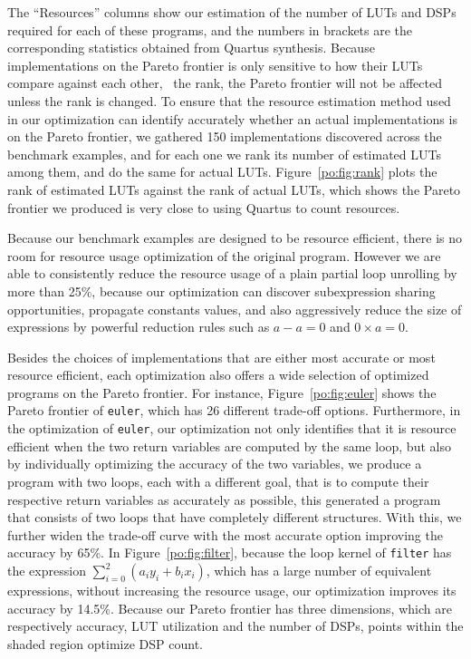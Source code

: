 \begin{figure*}[ht]
    \centering
    \begin{minipage}{0.6\textwidth}
    \end{minipage}\quad\begin{minipage}{0.35\textwidth}
    \end{minipage}
\end{figure*}

The ``Resources'' columns show our estimation of the number of LUTs and
DSPs required for each of these programs, and the numbers in brackets are
the corresponding statistics obtained from Quartus synthesis.  Because
implementations on the Pareto frontier is only sensitive to how their LUTs
compare against each other, \ie~the rank, the Pareto frontier will not be
affected unless the rank is changed.  To ensure that the resource estimation
method used in our optimization can identify accurately whether an actual
implementations is on the Pareto frontier, we gathered 150 implementations
discovered across the benchmark examples, and for each one we rank its
number of estimated LUTs among them, and do the same for actual LUTs.
Figure~\ref{po:fig:rank} plots the rank of estimated LUTs against the rank of
actual LUTs, which shows the Pareto frontier we produced is very close to using
Quartus to count resources.

Because our benchmark examples are designed to be resource efficient, there
is no room for resource usage optimization of the original program.  However
we are able to consistently reduce the resource usage of a plain partial
loop unrolling by more than 25\%, because our optimization can discover
subexpression sharing opportunities, propagate constants values, and also
aggressively reduce the size of expressions by powerful reduction rules such as
$a - a = 0$ and $0 \times a = 0$.

Besides the choices of implementations that are either most accurate or most
resource efficient, each optimization also offers a wide selection of optimized
programs on the Pareto frontier.  For instance, Figure~\ref{po:fig:euler}
shows the Pareto frontier of \texttt{euler}, which has 26 different trade-off
options.  Furthermore, in the optimization of \texttt{euler}, our optimization
not only identifies that it is resource efficient when the two return variables
are computed by the same loop, but also by individually optimizing the
accuracy of the two variables, we produce a program with two loops, each with
a different goal, that is to compute their respective return variables as
accurately as possible, this generated a program that consists of two loops
that have completely different structures.  With this, we further widen the
trade-off curve with the most accurate option improving the accuracy by 65\%.
In Figure~\ref{po:fig:filter}, because the loop kernel of \texttt{filter} has
the expression $\sum_{i=0}^2{(a_i y_i + b_i x_i)}$, which has a large number of
equivalent expressions, without increasing the resource usage, our optimization
improves its accuracy by 14.5\%.  Because our Pareto frontier has three
dimensions, which are respectively accuracy, LUT utilization and the number of
DSPs, points within the shaded region optimize DSP count.


